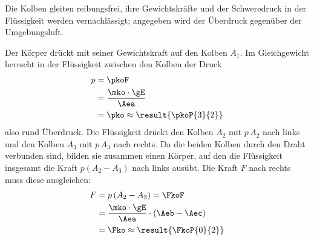 Die Kolben gleiten reibungsfrei, ihre Gewichtskräfte und der Schweredruck in der Flüssigkeit werden vernachlässigt; angegeben wird der Überdruck gegenüber der Umgebungsluft.
\begin{abcliste}
\abc Der Körper drückt mit seiner Gewichtskraft auf den Kolben $A_1$. Im Gleichgewicht herrscht in der Flüssigkeit zwischen den Kolben der Druck
\begin{align}
 p &= \pkoF \\
   &= \frac{\mko\cdot\gE}{\Aea} \\
   &= \pko \approx \result{\pkoP{3}{2}}
\end{align}
also rund  Überdruck.
\abc Die Flüssigkeit drückt den Kolben $A_2$ mit $p\,A_2$ nach links und den Kolben $A_3$ mit $p\,A_3$ nach rechts. Da die beiden Kolben durch den Draht verbunden sind, bilden sie zusammen einen Körper, auf den die Flüssigkeit insgesamt die Kraft $p\left(A_2-A_3\right)$ nach links ausübt. Die Kraft $F$ nach rechts muss diese ausgleichen:
\begin{align}
 F &= p\left(A_2-A_3\right) = \FkoF \\
   &= \frac{\mko\cdot\gE}{\Aea}\cdot\left(\Aeb-\Aec\right) \\
   &= \Fko \approx \result{\FkoP{0}{2}}
\end{align}
\end{abcliste}
